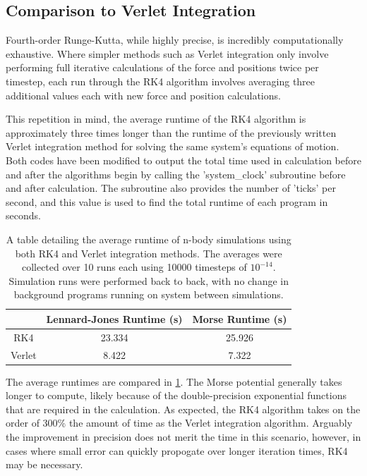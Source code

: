 \documentclass[12pt]{article}
\begin{document}
\subsection*{Comparison to Verlet Integration}
Fourth-order Runge-Kutta, while highly precise, is incredibly computationally exhaustive.  Where simpler methods such as Verlet integration only involve performing full iterative calculations of the force and positions twice per timestep, each run through the RK4 algorithm involves averaging three additional values each with new force and position calculations.

This repetition in mind, the average runtime of the RK4 algorithm is approximately three times longer than the runtime of the previously written Verlet integration method for solving the same system's equations of motion. \cite{me}  Both codes have been modified to output the total time used in calculation before and after the algorithms begin by calling the 'system\_clock' subroutine before and after calculation.  The subroutine also provides the number of 'ticks' per second, and this value is used to find the total runtime of each program in seconds.

\begin{table}[h!]
\begin{center}
\begin{tabular}{|c|cc|}
\hline
\quad & Lennard-Jones Runtime (s) & Morse Runtime (s) \\
\hline
RK4 & 23.334 & 25.926 \\
Verlet & 8.422 & 7.322\\
\hline
\end{tabular}
\end{center}
\label{runtimes}
\caption{A table detailing the average runtime of n-body simulations using both RK4 and Verlet integration methods.  The averages were collected over 10 runs each using 10000 timesteps of $10^{-14}$.  Simulation runs were performed back to back, with no change in background programs running on system between simulations.}
\end{table}

The average runtimes are compared in \ref{runtimes}.  The Morse potential generally takes longer to compute, likely because of the double-precision exponential functions that are required in the calculation.  As expected, the RK4 algorithm takes on the order of 300\% the amount of time as the Verlet integration algorithm.  Arguably the improvement in precision does not merit the time in this scenario, however, in cases where small error can quickly propogate over longer iteration times, RK4 may be necessary.
\end{document}
